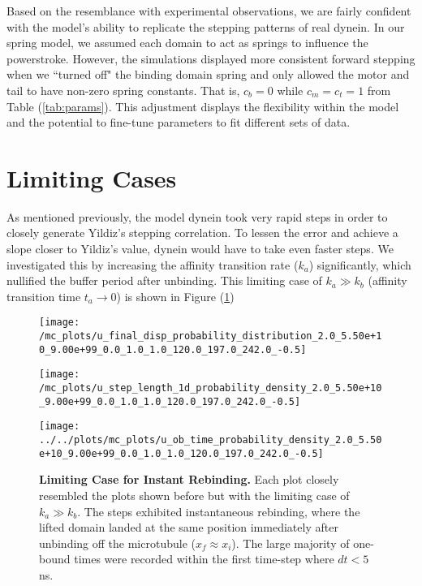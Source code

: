 Based on the resemblance with experimental observations, we are fairly confident with the model's ability to replicate the stepping patterns of real dynein. In our spring model, we assumed each domain to act as springs to influence the powerstroke. However, the simulations displayed more consistent forward stepping when we ``turned off" the binding domain spring and only allowed the motor and tail to have non-zero spring constants. That is, $c_b=0$ while $c_m=c_t=1$ from Table (\ref{tab:params}). This adjustment displays the flexibility within the model and the potential to fine-tune parameters to fit different sets of data. 

\newpage
\section{Limiting Cases}\label{sec:LimitingCases} 

As mentioned previously, the model dynein took very rapid steps in order to closely generate Yildiz's stepping correlation. To lessen the error and achieve a slope closer to Yildiz's value, dynein would have to take even faster steps. We investigated this by increasing the affinity transition rate ($k_a$) significantly, which nullified the buffer period after unbinding. This limiting case of $k_a\gg k_b$ (affinity transition time $t_a\to 0$) is shown in Figure (\ref{fig:DataFitYildiz99})

\begin{figure}[H]
	\begin{minipage}[b]{0.5\textwidth}
	\texttt{[image: /mc\_plots/u\_final\_disp\_probability\_distribution\_2.0\_5.50e+10\_9.00e+99\_0.0\_1.0\_1.0\_120.0\_197.0\_242.0\_-0.5]}
	\end{minipage}
	\begin{minipage}[b]{0.6\textwidth}		
	\texttt{[image: /mc\_plots/u\_step\_length\_1d\_probability\_density\_2.0\_5.50e+10\_9.00e+99\_0.0\_1.0\_1.0\_120.0\_197.0\_242.0\_-0.5]}
	\end{minipage}	
	\begin{center}
	\texttt{[image: ../../plots/mc\_plots/u\_ob\_time\_probability\_density\_2.0\_5.50e+10\_9.00e+99\_0.0\_1.0\_1.0\_120.0\_197.0\_242.0\_-0.5]}
	\end{center}	
	\caption[Limiting Case]{\textbf{Limiting Case for Instant Rebinding.} Each plot closely resembled the plots shown before but with the limiting case of $k_a\gg k_b$. The steps exhibited instantaneous rebinding, where the lifted domain landed at the same position immediately after unbinding off the microtubule ($x_f\approx x_i$). The large majority of one-bound times were recorded within the first time-step where $dt<5$ ns.} 
	\label{fig:DataFitYildiz99}
\end{figure}
\newpage

